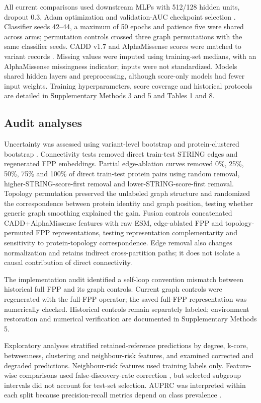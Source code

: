 \documentclass[conference]{IEEEtran}
\newcommand{\CADDAM}{CADD\allowbreak{}+\allowbreak{}AlphaMissense}
\begin{document}
All current comparisons used downstream MLPs with 512/128 hidden units, dropout 0.3, Adam optimization and validation-AUC checkpoint selection \cite{Kingma2015Adam}. Classifier seeds 42--44, a maximum of 50 epochs and patience five were shared across arms; permutation controls crossed three graph permutations with the same classifier seeds. CADD v1.7 and AlphaMissense scores were matched to variant records \cite{Schubach2024CADDv17,Cheng2023AlphaMissense}. Missing values were imputed using training-set medians, with an AlphaMissense missingness indicator; inputs were not standardized. Models shared hidden layers and preprocessing, although score-only models had fewer input weights. Training hyperparameters, score coverage and historical protocols are detailed in Supplementary Methods 3 and 5 and Tables 1 and 8.

\subsection{Audit analyses}

Uncertainty was assessed using variant-level bootstrap and protein-clustered bootstrap \cite{Efron1993Bootstrap}. Connectivity tests removed direct train-test STRING edges and regenerated FPP embeddings. Partial edge-ablation curves removed 0\%, 25\%, 50\%, 75\% and 100\% of direct train-test protein pairs using random removal, higher-STRING-score-first removal and lower-STRING-score-first removal. Topology permutation preserved the unlabeled graph structure and randomized the correspondence between protein identity and graph position, testing whether generic graph smoothing explained the gain. Fusion controls concatenated \CADDAM{} features with raw ESM, edge-ablated FPP and topology-permuted FPP representations, testing representation complementarity and sensitivity to protein-topology correspondence. Edge removal also changes normalization and retains indirect cross-partition paths; it does not isolate a causal contribution of direct connectivity.

The implementation audit identified a self-loop convention mismatch between historical full FPP and its graph controls. Current graph controls were regenerated with the full-FPP operator; the saved full-FPP representation was numerically checked. Historical controls remain separately labeled; environment restoration and numerical verification are documented in Supplementary Methods 5.

Exploratory analyses stratified retained-reference predictions by degree, k-core, betweenness, clustering and neighbour-risk features, and examined corrected and degraded predictions. Neighbour-risk features used training labels only. Feature-wise comparisons used false-discovery-rate correction \cite{Benjamini1995FDR}, but selected subgroup intervals did not account for test-set selection. AUPRC was interpreted within each split because precision-recall metrics depend on class prevalence \cite{Saito2015PrecisionRecall}.
\end{document}
